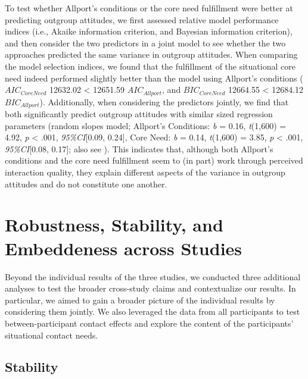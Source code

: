 To test whether Allport's conditions or the core need fulfillment were
better at predicting outgroup attitudes, we first assessed relative
model performance indices (i.e., Akaike information criterion, and
Bayesian information criterion), and then consider the two predictors in
a joint model to see whether the two approaches predicted the same
variance in outgroup attitudes. When comparing the model selection
indices, we found that the fulfillment of the situational core need
indeed performed slightly better than the model using Allport's
conditions (\(AIC_{CoreNeed}\) 12632.02 \textless{} 12651.59
\(AIC_{Allport}\), and \(BIC_{CoreNeed}\) 12664.55 \textless{} 12684.12
\(BIC_{Allport}\)). Additionally, when considering the predictors
jointly, we find that both significantly predict outgroup attitudes with
similar sized regression parameters (random slopes model; Allport's
Conditions: \textit{b} = 0.16, \textit{t}(1,600) = 4.92, \textit{p}
\textless{} .001, \textit{95\%CI}{[}0.09, 0.24{]}, Core Need: \textit{b}
= 0.14, \textit{t}(1,600) = 3.85, \textit{p} \textless{} .001,
\textit{95\%CI}{[}0.08, 0.17{]}; also see
). This indicates that, although both
Allport's conditions and the core need fulfillment seem to (in part)
work through perceived interaction quality, they explain different
aspects of the variance in outgroup attitudes and do not constitute one
another.

\section{Robustness, Stability, and Embeddeness across Studies}

Beyond the individual results of the three studies, we conducted three
additional analyses to test the broader cross-study claims and
contextualize our results. In particular, we aimed to gain a broader
picture of the individual results by considering them jointly. We also
leveraged the data from all participants to test between-participant
contact effects and explore the content of the participants' situational
contact needs.

\subsection{Stability}

